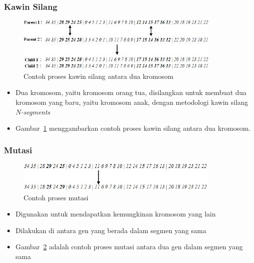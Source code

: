 \documentclass{beamer}
\begin{document}
\begin{frame}
\frametitle{Kawin Silang}
\begin{figure}
\centering
\captionsetup{justification=centering}
\includegraphics[scale=0.75]{Gambar/HybridGenetic9}
\caption[Contoh proses kawin silang antara dua kromosom]{Contoh proses kawin silang antara dua kromosom}
\label{fig:hybrid9}
\end{figure}
\begin{itemize}
\item Dua kromosom, yaitu kromosom orang tua, disilangkan untuk membuat dua kromosom yang baru, yaitu kromosom anak, dengan metodologi kawin silang \textit{\begin{math}N\end{math}-segments}
\item Gambar~\ref{fig:hybrid9} menggambarkan contoh proses kawin silang antara dua kromosom.
\end{itemize}
\end{frame}


\begin{frame}
\frametitle{Mutasi}
\begin{figure}
\centering
\captionsetup{justification=centering}
\includegraphics[scale=0.75]{Gambar/HybridGenetic10}
\caption[Contoh proses mutasi]{Contoh proses mutasi}
\label{fig:hybrid10}
\end{figure}
\begin{itemize}
\item Digunakan untuk mendapatkan kemungkinan kromosom yang lain
\item Dilakukan di antara gen yang berada dalam segmen yang sama
\item Gambar~\ref{fig:hybrid10} adalah contoh proses mutasi antara dua gen dalam segmen yang sama
\end{itemize}
\end{frame}
\end{document}
